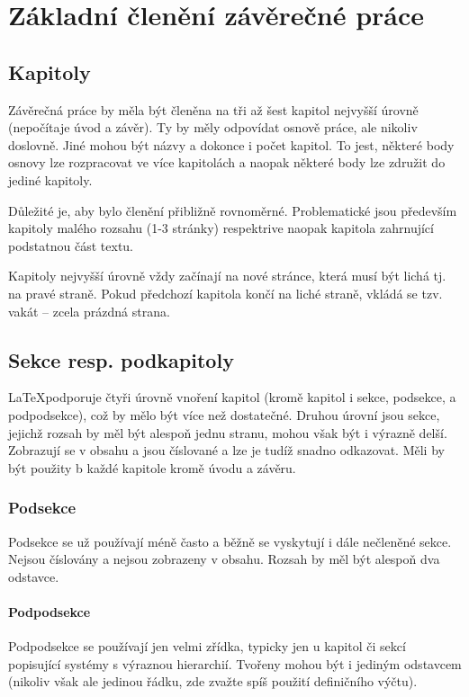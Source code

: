 \chapter{Základní členění závěrečné práce}

\section{Kapitoly}

Závěrečná práce by měla být členěna na tři až šest kapitol nejvyšší úrovně (nepočítaje úvod a závěr). Ty by měly odpovídat osnově práce, ale nikoliv doslovně. Jiné mohou být názvy a dokonce i počet kapitol. To jest, některé body osnovy lze rozpracovat ve více kapitolách a naopak některé body lze združit do jediné kapitoly.

Důležité je, aby bylo členění přibližně rovnoměrné. Problematické jsou především kapitoly malého rozsahu (1-3 stránky) respektrive naopak kapitola zahrnující podstatnou část textu.

Kapitoly nejvyšší úrovně vždy začínají na nové stránce, která musí být lichá tj. na pravé straně. Pokud předchozí kapitola končí na liché straně, vkládá se tzv. vakát -- zcela prázdná strana. 

\section{Sekce resp. podkapitoly}

\LaTeX podporuje čtyři úrovně vnoření kapitol (kromě kapitol i sekce, podsekce, a podpodsekce), což by mělo být více než dostatečné. Druhou úrovní jsou sekce, jejichž rozsah by měl být alespoň jednu stranu, mohou však být
i výrazně delší. Zobrazují se v obsahu a jsou číslované a lze je tudíž snadno odkazovat. Měli by být použity b každé kapitole kromě úvodu a závěru.

\subsection{Podsekce}

Podsekce se už používají méně často a běžně se vyskytují i dále nečleněné sekce. Nejsou číslovány a nejsou zobrazeny v obsahu. Rozsah by měl být alespoň dva odstavce.

\subsubsection{Podpodsekce}

Podpodsekce se používají jen velmi zřídka, typicky jen u kapitol či sekcí popisující systémy s výraznou hierarchií. Tvořeny mohou být i jediným odstavcem (nikoliv však ale jedinou řádku, zde zvažte spíš použití definičního výčtu).

